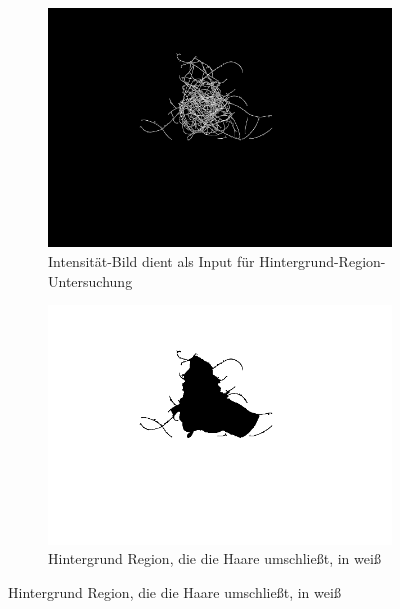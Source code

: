 \documentclass[german,a4paper, 12pt]{llncs}
\begin{document}
\begin{figure}[H]
	\medskip
	\begin{subfigure}{0.48\textwidth}
		\includegraphics[width=\linewidth]{figBina/08input intensity.png}
		\caption{Intensität-Bild dient als Input für Hintergrund-Region-Untersuchung} \label{fig:c}
	\end{subfigure}\hspace*{\fill}
	\begin{subfigure}{0.48\textwidth}
		\includegraphics[width=\linewidth]{figBina/08outer section.png}
		\caption{Hintergrund Region, die die Haare umschließt, in weiß} \label{fig:d}
	\end{subfigure}
	

\end{figure}
\end{document}
